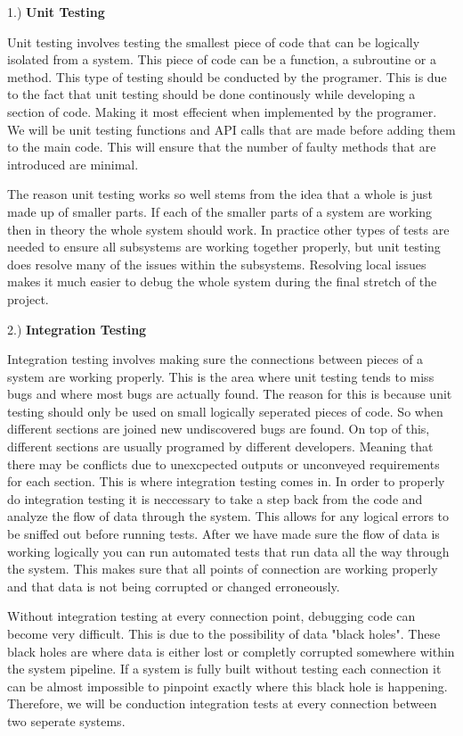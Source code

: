 1.) \textbf{Unit Testing}
\begin{adjustwidth}{3.5em}{0pt}
  Unit testing involves testing the smallest piece of code that can be logically isolated from a system. This piece of code can be a function, a subroutine or a method. This type of testing should be conducted by the programer. This is due to the fact that unit testing should be done continously while developing a section of code. Making it most effecient when implemented by the programer. We will be unit testing functions and API calls that are made before adding them to the main code. This will ensure that the number of faulty methods that are introduced are minimal.
  \par The reason unit testing works so well stems from the idea that a whole is just made up of smaller parts. If each of the smaller parts of a system are working then in theory the whole system should work. In practice other types of tests are needed to ensure all subsystems are working together properly, but unit testing does resolve many of the issues within the subsystems. Resolving local issues makes it much easier to debug the whole system during the final stretch of the project.
\end{adjustwidth}

\vspace{10mm}

2.) \textbf{Integration Testing}
\begin{adjustwidth}{3.5em}{0pt}
  Integration testing involves making sure the connections between pieces of a system are working properly. This is the area where unit testing tends to miss bugs and where most bugs are actually found. The reason for this is because unit testing should only be used on small logically seperated pieces of code. So when different sections are joined new undiscovered bugs are found. On top of this, different sections are usually programed by different developers. Meaning that there may be conflicts due to unexcpected outputs or unconveyed requirements for each section. This is where integration testing comes in. In order to properly do integration testing it is neccessary to take a step back from the code and analyze the flow of data through the system. This allows for any logical errors to be sniffed out before running tests. After we have made sure the flow of data is working logically you can run automated tests that run data all the way through the system. This makes sure that all points of connection are working properly and that data is not being corrupted or changed erroneously.
  \par Without integration testing at every connection point, debugging code can become very difficult. This is due to the possibility of data "black holes". These black holes are where data is either lost or completly corrupted somewhere within the system pipeline. If a system is fully built without testing each connection it can be almost impossible to pinpoint exactly where this black hole is happening. Therefore, we will be conduction integration tests at every connection between two seperate systems.
\end{adjustwidth}


